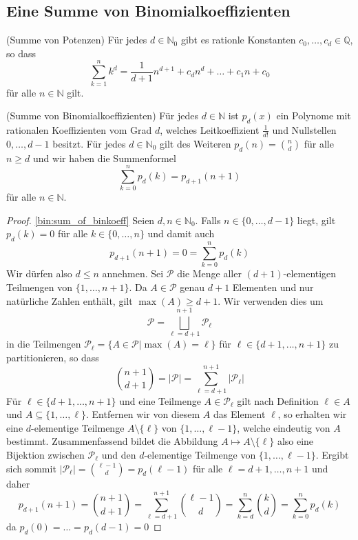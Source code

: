 \documentclass[../Analysis1_script.tex]{subfiles}
\begin{document}
\subsection{Eine Summe von Binomialkoeffizienten}

\begin{proposition}{(Summe von Potenzen)}\label{bin:sum_of_pot}
	Für jedes $d \in \mathbb{N}_0$ gibt es rationle Konstanten $c_0, \ldots, c_d \in \mathbb{Q}$, so dass
	\[\sum_{k=1}^{n}k^d = \frac{1}{d+1}n^{d+1} + c_{d}n^{d} + \ldots + c_{1}n + c_0\]
	für alle $n \in \mathbb{N}$ gilt.
\end{proposition}

\begin{proposition}{(Summe von Binomialkoeffizienten)}\label{bin:sum_of_binkoeff}
	Für jedes $d \in \mathbb{N}$ ist $p_{d}(x)$ ein Polynome mit rationalen Koeffizienten vom Grad $d$, welches Leitkoeffizient $\frac{1}{d!}$ und Nullstellen $0, \ldots, d-1$ besitzt. Für jedes $d \in \mathbb{N}_0$ gilt des Weiteren $p_{d}(n) = \binom{n}{d}$ für alle $n \geq d$ und wir haben die Summenformel 
	\[\sum_{k=0}^{n}p_{d}(k) = p_{d+1}(n+1)\]
	für alle $n \in \mathbb{N}$.
\end{proposition}

\begin{proof}\ref{bin:sum_of_binkoeff}
	Seien $d, n \in \mathbb{N}_0$. Falls $n \in \{0, \ldots, d-1\}$ liegt, gilt $p_{d}(k) = 0$ für alle $k \in \{0, \ldots, n\}$ und damit auch
	\[p_{d+1}(n+1) = 0 = \sum_{k=0}^{n}p_{d}(k)\]
	Wir dürfen also $d \leq n$ annehmen. Sei $\mathcal{P}$ die Menge aller $(d+1)$-elementigen Teilmengen von $\{1, \ldots, n+1\}$. Da $A \in \mathcal{P}$ genau $d+1$ Elementen und nur natürliche Zahlen enthält, gilt $\max(A) \geq d+1$. Wir verwenden dies um 
	\[\mathcal{P} = \bigsqcup_{\ell=d+1}^{n+1}\mathcal{P}_{\ell}\]
	in die Teilmengen $\mathcal{P}_{\ell} = \{A \in \mathcal{P} | \max(A) = \ell\}$ für $\ell \in \{d+1, \ldots, n+1\}$ zu partitionieren, so dass
	\[\binom{n+1}{d+1} = |\mathcal{P}| = \sum_{\ell=d+1}^{n+1}|\mathcal{P}_{\ell}|\]
	Für $\ell \in \{d+1, \ldots, n+1\}$ und eine Teilmenge $A \in \mathcal{P}_{\ell}$ gilt nach Definition $\ell \in A$ und $A \subseteq \{1, \ldots, \ell\}$. Entfernen wir von diesem $A$ das Element $\ell$, so erhalten wir eine $d$-elementige Teilmenge $A \setminus \{\ell\}$ von $\{1, \ldots, \ell-1\}$, welche eindeutig von $A$ bestimmt. Zusammenfassend bildet die Abbildung $A \mapsto A \setminus \{\ell\}$ also eine Bijektion zwischen $\mathcal{P}_{\ell}$ und den $d$-elementige Teilmenge von $\{1, \ldots, \ell-1\}$. Ergibt sich sommit $|\mathcal{P}_{\ell}| = \binom{\ell-1}{d} = p_{d}(\ell-1)$ für alle $\ell = d+1, \ldots, n+1$ und daher
	\[p_{d+1}(n+1) = \binom{n+1}{d+1} = \sum_{\ell=d+1}^{n+1}\binom{\ell-1}{d} = \sum_{k=d}^{n}\binom{k}{d} = \sum_{k=0}^{n}p_{d}(k)\]
	da $p_{d}(0) = \dots = p_{d}(d-1) = 0$
\end{proof}
\end{document}
